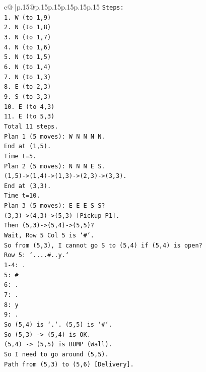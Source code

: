\documentclass{article}
\begin{document}
{\begin{supertabular}{c@{$\;$}|p{.15\linewidth}@{}p{.15\linewidth}p{.15\linewidth}p{.15\linewidth}p{.15\linewidth}p{.15\linewidth}}
{{{\texttt{Steps:} \\
\texttt{1. W (to 1,9)} \\
\texttt{2. N (to 1,8)} \\
\texttt{3. N (to 1,7)} \\
\texttt{4. N (to 1,6)} \\
\texttt{5. N (to 1,5)} \\
\texttt{6. N (to 1,4)} \\
\texttt{7. N (to 1,3)} \\
\texttt{8. E (to 2,3)} \\
\texttt{9. S (to 3,3)} \\
\texttt{10. E (to 4,3)} \\
\texttt{11. E (to 5,3)} \\
\texttt{Total 11 steps.} \\
\texttt{Plan 1 (5 moves): W N N N N.} \\
\texttt{End at (1,5).} \\
\texttt{Time t=5.} \\
\texttt{Plan 2 (5 moves): N N N E S.} \\
\texttt{(1,5){-}>(1,4){-}>(1,3){-}>(2,3){-}>(3,3).} \\
\texttt{End at (3,3).} \\
\texttt{Time t=10.} \\
\texttt{Plan 3 (5 moves): E E E S S?} \\
\texttt{(3,3){-}>(4,3){-}>(5,3) {[}Pickup P1{]}.} \\
\texttt{Then (5,3){-}>(5,4){-}>(5,5)?} \\
\texttt{Wait, Row 5 Col 5 is `\#`.} \\
\texttt{So from (5,3), I cannot go S to (5,4) if (5,4) is open?} \\
\texttt{Row 5: `....\#..y.`} \\
\texttt{1{-}4: .} \\
\texttt{5: \#} \\
\texttt{6: .} \\
\texttt{7: .} \\
\texttt{8: y} \\
\texttt{9: .} \\
\texttt{So (5,4) is `.`. (5,5) is `\#`.} \\
\texttt{So (5,3) {-}> (5,4) is OK.} \\
\texttt{(5,4) {-}> (5,5) is BUMP (Wall).} \\
\texttt{So I need to go around (5,5).} \\
\texttt{Path from (5,3) to (5,6) {[}Delivery{]}.} \\
}}}
\end{supertabular}}
\end{document}
